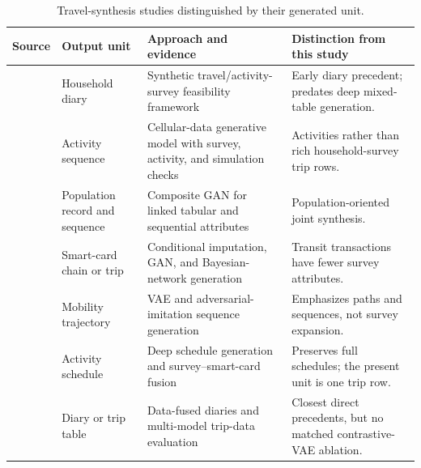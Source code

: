 \begin{table}[!htbp]
\caption{Travel-synthesis studies distinguished by their generated unit.}
\label{tab:literature_trip}
\centering
\setlength{\tabcolsep}{3.0pt}
\begin{tabularx}{\textwidth}{P{0.16\textwidth} P{0.18\textwidth} Y Y}
\toprule
\textbf{Source} & \textbf{Output unit} & \textbf{Approach and evidence} & \textbf{Distinction from this study} \\
\midrule
\cite{greaves2000survey} & Household diary & Synthetic travel/activity-survey feasibility framework & Early diary precedent; predates deep mixed-table generation. \\
\cite{yin2018activities} & Activity sequence & Cellular-data generative model with survey, activity, and simulation checks & Activities rather than rich household-survey trip rows. \\
\cite{badumarfo2022composite} & Population record and sequence & Composite GAN for linked tabular and sequential attributes & Population-oriented joint synthesis. \\
\cite{kim2022tripchains,kieu2023smartcard} & Smart-card chain or trip & Conditional imputation, GAN, and Bayesian-network generation & Transit transactions have fewer survey attributes. \\
\cite{huang2019urbanvae,choi2021trajgail} & Mobility trajectory & VAE and adversarial-imitation sequence generation & Emphasizes paths and sequences, not survey expansion. \\
\cite{lee2025collagan,shone2025scheduling,vo2026harnessing} & Activity schedule & Deep schedule generation and survey--smart-card fusion & Preserves full schedules; the present unit is one trip row. \\
\cite{kressner2017nchrp,wu2026evaluation} & Diary or trip table & Data-fused diaries and multi-model trip-data evaluation & Closest direct precedents, but no matched contrastive-VAE ablation. \\
\bottomrule
\end{tabularx}
\end{table}

